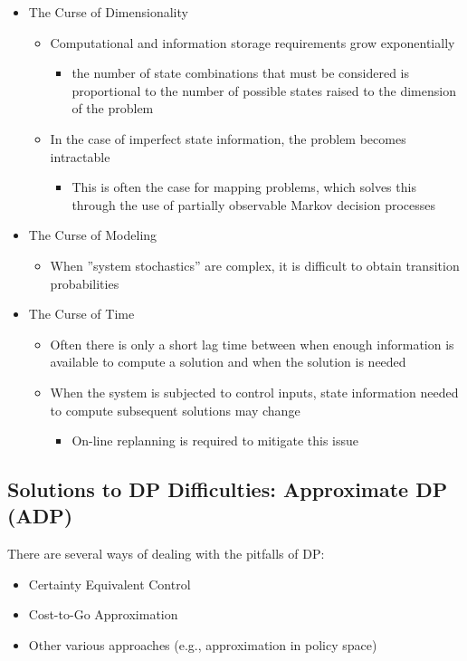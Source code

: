 \documentclass[twoside]{article}
\begin{document}
\begin{itemize}
  \item The Curse of Dimensionality
    \begin{itemize}
      \item Computational and information storage requirements grow exponentially
        \begin{itemize}
            \item the number of state combinations that must be considered is proportional to the number of
possible states raised to the dimension of the problem
        \end{itemize}
      \item In the case of imperfect state information, the problem becomes intractable
        \begin{itemize}
            \item This is often the case for mapping problems, which solves this through the use of partially
observable Markov decision processes
        \end{itemize}
    \end{itemize}
  \item The Curse of Modeling
    \begin{itemize}
        \item When ”system stochastics” are complex, it is difficult to obtain transition probabilities
    \end{itemize}
  \item The Curse of Time
    \begin{itemize}
        \item Often there is only a short lag time between when enough information is available to compute
a solution and when the solution is needed
        \item When the system is subjected to control inputs, state information needed to compute subsequent
solutions may change
            \begin{itemize}
                \item On-line replanning is required to mitigate this issue
            \end{itemize}
    \end{itemize}
\end{itemize}


\subsection{Solutions to DP Difficulties: Approximate DP (ADP)}
There are several ways of dealing with the pitfalls of DP:
\begin{itemize}
    \item Certainty Equivalent Control
    \item Cost-to-Go Approximation
    \item Other various approaches (e.g., approximation in policy space)
\end{itemize}
\end{document}

